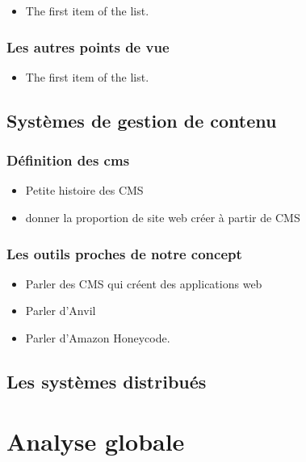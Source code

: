 \documentclass{rapport_stage}
\begin{document}
\begin{itemize}[label=$\bullet$]
  \item The first item of the list.
\end{itemize}

\subsection*{Les autres points de vue}

\begin{itemize}[label=$\bullet$]
  \item The first item of the list.
\end{itemize}

\section{Systèmes de gestion de contenu}


\subsection*{Définition des \gls{cms}}

\begin{itemize}[label=$\bullet$]
  \item Petite histoire des CMS
  \item donner la proportion de site web créer à partir de CMS
\end{itemize}

\subsection*{Les outils proches de notre concept}

\begin{itemize}[label=$\bullet$]
  \item Parler des CMS qui créent des applications web
  \item Parler d'Anvil
  \item Parler d'Amazon Honeycode.
\end{itemize}

\section{Les systèmes distribués}

\chapter{Analyse globale}
\end{document}
